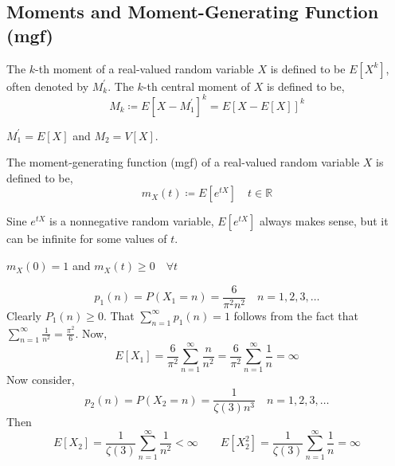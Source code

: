 \subsection{Moments and Moment-Generating Function (mgf)}
\begin{definition}
    The $k$-th moment of a real-valued random variable $X$ is defined to be
$E[X^k]$, often denoted by $M_k^\prime$. The $k$-th central moment of $X$ is
defined to be,
    \[ M_k \coloneqq E[X - M_1^\prime]^k = E[X- E[X]]^k                      \]
\end{definition}
\note $M_1^\prime = E[X]$ and $M_2 = V[X]$.

\begin{definition}
    The moment-generating function (mgf) of a real-valued random variable $X$
is defined to be,
    \[ m_X(t) \coloneqq E[e^{tX}] \quad t \in \mathbb{R}                     \]
\end{definition}
\note Sine $e^{tX}$ is a nonnegative random variable, $E[e^{tX}]$ always makes
sense, but it can be infinite for some values of $t$.

\note $m_X(0) = 1$ and $m_X(t) \geq 0 \quad \forall t$

\begin{example}
\[ p_1(n) = P(X_1 = n) = \frac{6}{\pi^2 n^2} \quad n = 1, 2, 3, \dots       \]
Clearly $P_1(n) \geq 0$. That $\sum_{n = 1}^\infty p_1(n) = 1$ follows from the
fact that $\sum_{n = 1}^\infty \frac{1}{n^2} = \frac{\pi^2}{6}$. Now,
\[ E[X_1] = \frac{6}{\pi^2} \sum_{n = 1}^\infty \frac{n}{n^2}
          = \frac{6}{\pi^2} \sum_{n = 1}^\infty \frac{1}{n}
          = \infty                                                          \]
Now consider,
\[ p_2(n) = P(X_2 = n) = \frac{1}{\zeta(3) n^3} \quad n = 1, 2, 3, \dots    \]
Then
\[  E[X_2] = \frac{1}{\zeta(3)} \sum_{n = 1}^\infty \frac{1}{n^2} < \infty
    \qquad
    E[X_2^2] = \frac{1}{\zeta(3)} \sum_{n = 1}^\infty \frac{1}{n} = \infty  \]
\end{example}

